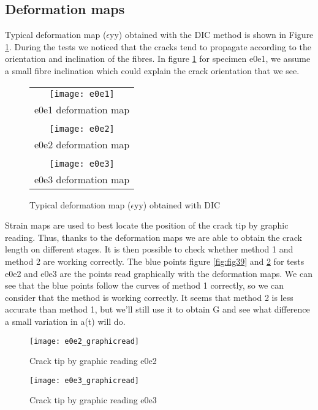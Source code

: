 \subsection{Deformation maps}

Typical deformation map ($\epsilon$yy) obtained with the DIC method is shown in Figure \ref{fig:Strain_def}.
During the tests we noticed that the cracks tend to propagate according to the orientation and inclination of the fibres.
In figure \ref{fig:Strain_def} for specimen e0e1, we assume a small fibre inclination which could explain the crack orientation that we see.

\begin{figure}[htp]
	\centering
	\begin{tabular}{c}
		\texttt{[image: e0e1]} \\
		e0e1 deformation map \\
		\\
		\texttt{[image: e0e2]} \\
		e0e2 deformation map \\
		\\
		\texttt{[image: e0e3]} \\
		e0e3 deformation map \\
	\end{tabular}
	\caption{Typical deformation map ($\epsilon$yy) obtained with DIC}
	\label{fig:Strain_def}
\end{figure}

Strain maps are used to best locate the position of the crack tip by graphic reading.
Thus, thanks to the deformation maps we are able to obtain the crack length on different stages. It is then possible to check whether method 1 and method 2 are working correctly.
The blue points figure \ref{fig:fig39} and \ref{fig:fig40} for tests e0e2 and e0e3 are the points read graphically with the deformation maps. We can see that the blue points follow the curves of method 1 correctly, so we can consider that the method is working correctly. 
It seems that method 2 is less accurate than method 1, but we'll still use it to obtain G and see what difference a small variation in a(t) will do.

\begin{figure}[htp]
	\begin{minipage}[c]{.46\linewidth}
		\centering
		\texttt{[image: e0e2\_graphicread]}
		\caption{Crack tip by graphic reading e0e2}
		\label{fig:fig39}
	\end{minipage}
	\hfill%
	\begin{minipage}[c]{.46\linewidth}
		\centering
		\texttt{[image: e0e3\_graphicread]}
		\caption{Crack tip by graphic reading e0e3 }
		\label{fig:fig40}
	\end{minipage}
\end{figure}



